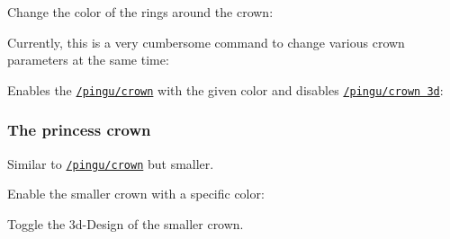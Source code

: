 \documentclass[parskip=half,english,numbers=noenddot,footnotes=nomultiple,oneside]{scrartcl}
\def\lpingu#1{\lstinline[style=lstpingu,language=pingulang]'#1'}
\newcommand*\keyref[2][/pingu/]{\hyperref[pk:#1#2]{\lpingu{#1#2}}}
\begin{document}
{\def\pingu@color@crown{<crown-color>}
Change the color of the rings around the crown:
\begin{tcblisting}{}
\begin{tikzpicture}
	\pingu[crown, crown gem ring=green]
\end{tikzpicture}
\end{tcblisting}
\endsubkeyexplain}

Currently, this is a very cumbersome command to change various crown parameters at the same time:
\begin{tcblisting}{}
\begin{tikzpicture}
	\pingu[crown, eyes wink,
		crown position={1:(-.1cm,-.275cm){1.33}}]
\end{tikzpicture}
\end{tcblisting}
\endsubkeyexplain

Enables the \keyref{crown} with the given color and disables \keyref{crown 3d}:
\begin{tcblisting}{}
\begin{tikzpicture}
	\pingu[crown 2d=green]
\end{tikzpicture}
\end{tcblisting}
\endkeyexplain

\subsubsection{The princess crown}
Similar to \keyref{crown} but smaller.

Enable the smaller crown with a specific color:
\begin{tcblisting}{}
\begin{tikzpicture}
	\pingu[princess crown=green]
\end{tikzpicture}
\end{tcblisting}
\endkeyexplain

Toggle the 3d-Design of the smaller crown.
\begin{tcblisting}{}
\begin{tikzpicture}
	\pingu[princess crown, princess crown 3d=false]
\end{tikzpicture}
\end{tcblisting}
\endsubkeyexplain
\end{document}
